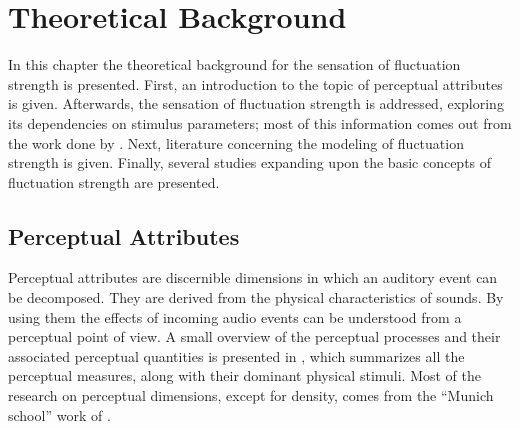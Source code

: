\documentclass[../main.tex]{subfiles}
\begin{document}
\chapter{Theoretical Background}
\label{cha:theoretical}

In this chapter the theoretical background for the sensation of fluctuation
strength is presented. First, an introduction to the topic of perceptual
attributes is given. Afterwards, the sensation of fluctuation strength is
addressed, exploring its dependencies on stimulus parameters; most of this
information comes out from the work done by \textcite{Fastl2007Psychoacoustics}.
Next, literature concerning the modeling of fluctuation strength is given.
Finally, several studies expanding upon the basic concepts of fluctuation
strength are presented.

\begin{theoreticalbackground}

\section{Perceptual Attributes}

Perceptual attributes are discernible dimensions in which an auditory event can
be decomposed. They are derived from the physical characteristics of sounds. By
using them the effects of incoming audio events can be understood from a
perceptual point of view. A small overview of the perceptual processes and their
associated perceptual quantities is presented in , which
summarizes all the perceptual measures, along with their dominant physical
stimuli. Most of the research on perceptual dimensions, except for density,
comes from the ``Munich school'' work of \textcite{Fastl2007Psychoacoustics}.


\end{theoreticalbackground}
\end{document}
